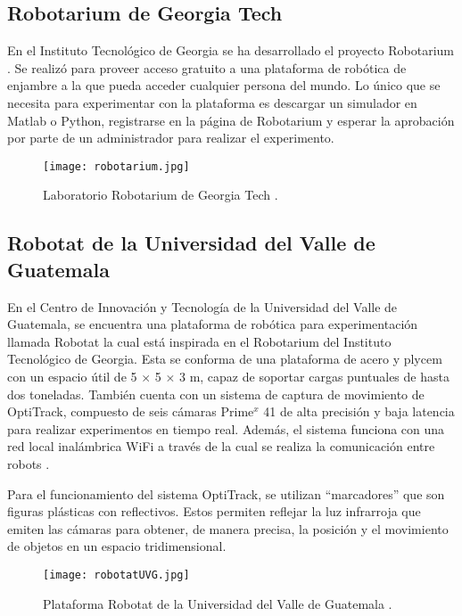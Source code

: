 \subsection*{Robotarium de Georgia Tech}
En el Instituto Tecnológico de Georgia se ha desarrollado el proyecto Robotarium \cite{Robotarium}. Se realizó para proveer acceso gratuito a una plataforma de robótica de enjambre a la que pueda acceder cualquier persona del mundo. Lo único que se necesita para experimentar con la plataforma es descargar un simulador en Matlab o Python, registrarse en la página de Robotarium y esperar la aprobación por parte de un administrador para realizar el experimento.

\begin{figure}[H]
	\centering
	\texttt{[image: robotarium.jpg]}
	\caption{Laboratorio Robotarium de Georgia Tech \cite{Robotarium}.}
	\label{fig:robotarium}
\end{figure}

\subsection*{Robotat de la Universidad del Valle de Guatemala}
En el Centro de Innovación y Tecnología de la Universidad del Valle de Guatemala, se encuentra una plataforma de robótica para experimentación llamada Robotat la cual está inspirada en el Robotarium del Instituto Tecnológico de Georgia. Esta se conforma de una plataforma de acero y plycem con un espacio útil de 5 $\times$ 5 $\times$ 3 m, capaz de soportar cargas puntuales de hasta dos toneladas. También cuenta con un sistema de captura de movimiento de OptiTrack, compuesto de seis cámaras Prime$^x$ 41 de alta precisión y baja latencia para realizar experimentos en tiempo real. Además, el sistema funciona con una red local inalámbrica WiFi a través de la cual se realiza la comunicación entre robots \cite{Robotat}. 

Para el funcionamiento del sistema OptiTrack, se utilizan ``marcadores'' que son figuras plásticas con reflectivos. Estos permiten reflejar la luz infrarroja que emiten las cámaras para obtener, de manera precisa, la posición y el movimiento de objetos en un espacio tridimensional.

\begin{figure}[H]
	\centering
	\texttt{[image: robotatUVG.jpg]}
	\caption{Plataforma Robotat de la Universidad del Valle de Guatemala \cite{imgRobotat}.}
	\label{fig:robotat}
\end{figure}

